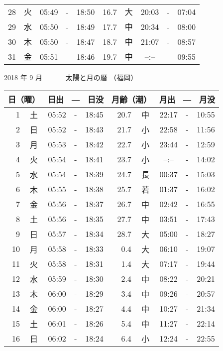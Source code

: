 \documentclass[a4j,10pt]{jsarticle}
\begin{document}
\begin{center}
\begin{table}[ht]
\begin{center}
\begin{tabular}{|rc|ccc|rc|ccc|}
 28 & 火 & 05:49 &-& 18:50 & 16.7 & 大 & 20:03 &-& 07:04 \\
 29 & 水 & 05:50 &-& 18:49 & 17.7 & 中 & 20:34 &-& 08:00 \\
 30 & 木 & 05:50 &-& 18:47 & 18.7 & 中 & 21:07 &-& 08:57 \\
 31 & 金 & 05:51 &-& 18:46 & 19.7 & 中 &  --:--  &-& 09:55 \\
    \hline
    \end{tabular}
    \end{center}
\end{table}
\newpage
  {\large 2018 年  9 月}
  {\Large 　　　太陽と月の暦   （福岡） }
  \begin{table}[ht]
  \begin{center}
     \begin{tabular}{|rc|ccc|rc|ccc|}
     \hline
     \multicolumn{2}{|c|}{日（曜）} & \multicolumn{3}{c|}{日出　―　日没} & \multicolumn{2}{c|}{月齢（潮）} & \multicolumn{3}{c|}{月出　―　月没}\\
     \hline
  1 & 土 & 05:52 &-& 18:45 & 20.7 & 中 & 22:17 &-& 10:55 \\
  2 & 日 & 05:52 &-& 18:43 & 21.7 & 小 & 22:58 &-& 11:56 \\
  3 & 月 & 05:53 &-& 18:42 & 22.7 & 小 & 23:44 &-& 12:59 \\
  4 & 火 & 05:54 &-& 18:41 & 23.7 & 小 &  --:--  &-& 14:02 \\
  5 & 水 & 05:54 &-& 18:39 & 24.7 & 長 & 00:37 &-& 15:03 \\
  6 & 木 & 05:55 &-& 18:38 & 25.7 & 若 & 01:37 &-& 16:02 \\
  7 & 金 & 05:56 &-& 18:37 & 26.7 & 中 & 02:42 &-& 16:55 \\
  8 & 土 & 05:56 &-& 18:35 & 27.7 & 中 & 03:51 &-& 17:43 \\
  9 & 日 & 05:57 &-& 18:34 & 28.7 & 大 & 05:00 &-& 18:27 \\
 10 & 月 & 05:58 &-& 18:33 &  0.4 & 大 & 06:10 &-& 19:07 \\
 11 & 火 & 05:58 &-& 18:31 &  1.4 & 大 & 07:17 &-& 19:44 \\
 12 & 水 & 05:59 &-& 18:30 &  2.4 & 中 & 08:22 &-& 20:21 \\
 13 & 木 & 06:00 &-& 18:29 &  3.4 & 中 & 09:26 &-& 20:57 \\
 14 & 金 & 06:00 &-& 18:27 &  4.4 & 中 & 10:27 &-& 21:34 \\
 15 & 土 & 06:01 &-& 18:26 &  5.4 & 中 & 11:27 &-& 22:14 \\
 16 & 日 & 06:02 &-& 18:24 &  6.4 & 小 & 12:24 &-& 22:55 \\

\end{tabular}
\end{center}
\end{table}
\end{center}
\end{document}
